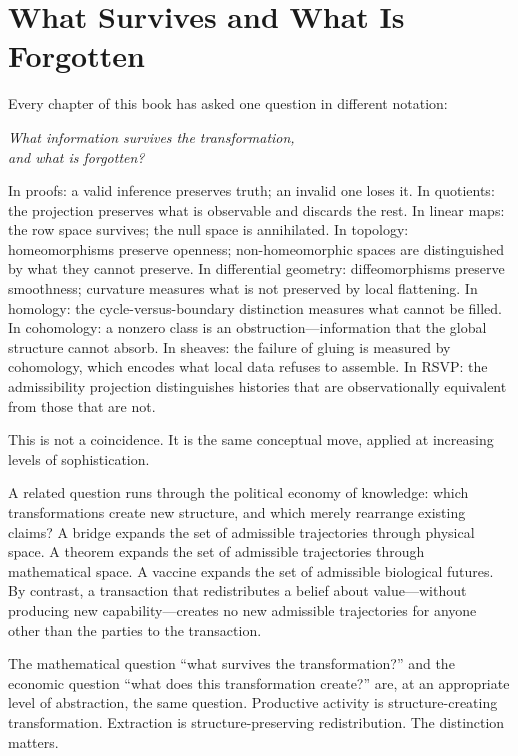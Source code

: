 \documentclass[12pt, twoside, openright, a4paper]{book}
\begin{document}
\section{What Survives and What Is Forgotten}

Every chapter of this book has asked one question in different notation:

\begin{tcolorbox}[enhanced, colback=RSVPdeep, colframe=RSVPdeep, coltext=white,
  arc=6pt, boxrule=0pt, left=10mm, right=10mm, top=5mm, bottom=5mm, halign=center]
\large\itshape What information survives the transformation,\\and what is forgotten?
\end{tcolorbox}

\medskip

In proofs: a valid inference preserves truth; an invalid one loses it.
In quotients: the projection preserves what is observable and discards the rest.
In linear maps: the row space survives; the null space is annihilated.
In topology: homeomorphisms preserve openness; non-homeomorphic spaces are distinguished by what they cannot preserve.
In differential geometry: diffeomorphisms preserve smoothness; curvature measures what is not preserved by local flattening.
In homology: the cycle-versus-boundary distinction measures what cannot be filled.
In cohomology: a nonzero class is an obstruction---information that the global structure cannot absorb.
In sheaves: the failure of gluing is measured by cohomology, which encodes what local data refuses to assemble.
In RSVP: the admissibility projection distinguishes histories that are observationally equivalent from those that are not.

This is not a coincidence. It is the same conceptual move, applied at increasing levels of sophistication.

\begin{remarkbox}
A related question runs through the political economy of knowledge: which transformations create new structure, and which merely rearrange existing claims? A bridge expands the set of admissible trajectories through physical space. A theorem expands the set of admissible trajectories through mathematical space. A vaccine expands the set of admissible biological futures. By contrast, a transaction that redistributes a belief about value---without producing new capability---creates no new admissible trajectories for anyone other than the parties to the transaction.

The mathematical question ``what survives the transformation?'' and the economic question ``what does this transformation create?'' are, at an appropriate level of abstraction, the same question. Productive activity is structure-creating transformation. Extraction is structure-preserving redistribution. The distinction matters.
\end{remarkbox}
\end{document}
